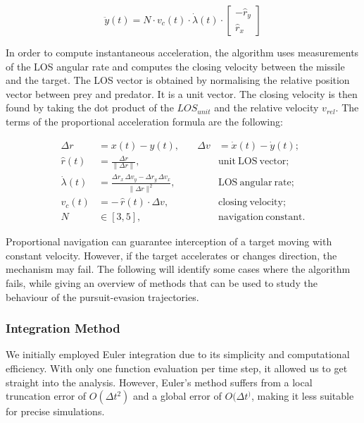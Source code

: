 \documentclass[11pt]{article}
\begin{document}
        \[
          \ddot{y}(t) = N \cdot v_c(t) \cdot \dot{\lambda}(t) \cdot
          \begin{bmatrix} -\hat{r}_y \\ \hat{r}_x
          \end{bmatrix}
        \]

        In order to compute instantaneous acceleration, the algorithm uses measurements of the LOS angular rate and computes the closing velocity between the missile and the target. The LOS vector is obtained by normalising the relative position vector between prey and predator. It is a unit vector. The closing velocity is then found by taking the dot product of the $\textit{LOS}_{unit}$ and the relative velocity $\textit{v}_{rel}$. The terms of the proportional acceleration formula are the following:

        \[
          \begin{aligned}
            \Delta r &= x(t) - y(t),
            &\quad \Delta v &= \dot x(t) - \dot y(t);\\[0.5em]
            \hat r(t) &= \frac{\Delta r}{\|\Delta r\|},
            &\quad &\mathrm{unit\ LOS\ vector};\\
            \dot\lambda(t) &= \frac{\Delta r_x\,\Delta v_y - \Delta r_y\,\Delta v_x}{\|\Delta r\|^2},
            &\quad &\mathrm{LOS\ angular\ rate};\\
            v_c(t) &= -\,\hat r(t)\cdot\Delta v,
            &\quad &\mathrm{closing\ velocity};\\
            N &\in [3,5],
            &\quad &\mathrm{navigation\ constant}.
          \end{aligned}
        \]

        Proportional navigation can guarantee interception of a target moving with constant velocity. However, if the target accelerates or changes direction, the mechanism may fail. The following will identify some cases where the algorithm fails, while giving an overview of methods that can be used to study the behaviour of the pursuit-evasion trajectories.

        \subsubsection{Integration Method}
        We initially employed Euler integration due to its simplicity and computational efficiency. With only one function evaluation per time step, it allowed us to get straight into the analysis. However, Euler's method suffers from a local truncation error of $O(\Delta t^2)$ and a global error of $O(\Delta t^)$, making it less suitable for precise simulations.
\end{document}
